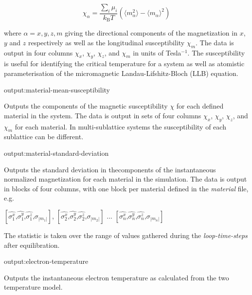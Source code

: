 \begin{equation*}
\chi_{\alpha} = \frac{\sum_i \mu_i}{k_{\mathrm{B}}T}\left(\langle m_{\alpha}^2\rangle - \langle m_{\alpha}\rangle^2 \right)
\end{equation*}

\noindent where $\alpha = x,y,z,m$ giving the directional components of the magnetization in $x$, $y$ and $z$ respectively as well as the longitudinal susceptibility $\chi_m$. The data is output in four columns $\chi_x$, $\chi_y$, $\chi_z$, and $\chi_m$ in units of Tesla$^{-1}$. The susceptibility is useful for identifying the critical temperature for a system as well as atomistic parameterisation of the micromagnetic
Landau-Lifshitz-Bloch (LLB) equation.

{\zicf output:material-mean-susceptibility} Outputs
the components of the magnetic susceptibility $\chi$ for each defined material in the system. The data is output in sets of
four columns $\chi_x$, $\chi_y$, $\chi_z$, and $\chi_m$ for each material. In multi-sublattice systems the susceptibility of
each sublattice can be different.

{\zicf output:material-standard-deviation} Outputs the standard deviation in the\newline components of the instantaneous normalized magnetization for each material in the simulation. The data is output in blocks of four columns, with one block per material defined in the \textit{material} file, e.g.

\begin{center}
$\left[ \hat{\sigma_1^x} \textrm{,} \hat{\sigma_1^y} \textrm{,} \hat{\sigma_1^z} \textrm{,} \sigma_{|m_1|} \right]$,
$\left[ \hat{\sigma_2^x} \textrm{,} \hat{\sigma_2^y} \textrm{,} \hat{\sigma_2^z} \textrm{,} \sigma_{|m_2|} \right]$ ...
$\left[ \hat{\sigma_n^x} \textrm{,} \hat{\sigma_n^y} \textrm{,} \hat{\sigma_n^z} \textrm{,} \sigma_{|m_n|} \right]$
\end{center}

The statistic is taken over the range of values gathered during the \textit{loop-time-steps} after equilibration.

{\zicf output:electron-temperature} Outputs the instantaneous electron temperature as calculated from the two temperature model.

